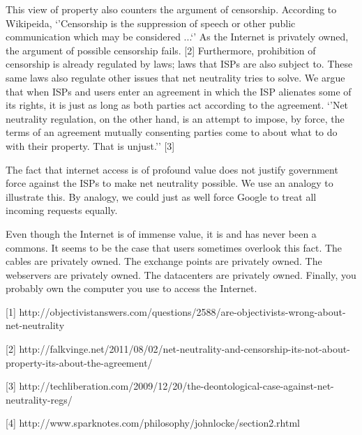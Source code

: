This view of property also counters the argument of censorship. According to Wikipeida, `'Censorship is the suppression of speech or other public communication which may be considered ...`' As the Internet is privately owned, the argument of possible censorship fails. [2] Furthermore, prohibition of censorship is already regulated by laws; laws that \acp{ISP} are also subject to. These same laws also regulate other issues that net neutrality tries to solve. We argue that when \acp{ISP} and users enter an agreement in which the \ac{ISP} alienates some of its rights, it is just as long as both parties act according to the agreement. `'Net neutrality regulation, on the other hand, is an attempt to impose, by force, the terms of an agreement mutually consenting parties come to about what to do with their property. That is unjust.'' [3]

The fact that internet access is of profound value does not justify government force against the \acp{ISP} to make net neutrality possible. We use an analogy to illustrate this. By analogy, we could just as well force Google to treat all incoming requests equally. %

Even though the Internet is of immense value, it is and has never been a commons. It seems to be the case that users sometimes overlook this fact. The cables are privately owned. The exchange points are privately owned. The webservers are privately owned. The datacenters are privately owned. Finally, you probably own the computer you use to access the Internet.


[1] http://objectivistanswers.com/questions/2588/are-objectivists-wrong-about-net-neutrality

[2] http://falkvinge.net/2011/08/02/net-neutrality-and-censorship-its-not-about-property-its-about-the-agreement/

[3] http://techliberation.com/2009/12/20/the-deontological-case-against-net-neutrality-regs/

[4] http://www.sparknotes.com/philosophy/johnlocke/section2.rhtml
